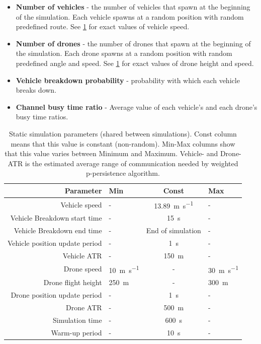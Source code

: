 \documentclass[]{nsm-thesis}
\begin{document}
\begin{itemize}

	\item \textbf{Number of vehicles} - the number of vehicles that spawn at the beginning of the simulation. Each vehicle spawns at a random position with random predefined route. See \cref{tab:simulationparams} for exact values of vehicle speed.
	
	\item \textbf{Number of drones} - the number of drones that spawn at the beginning of the simulation. Each drone spawns at a random position with random predefined angle and speed. See \cref{tab:simulationparams} for exact values of drone height and speed.
	
	\item \textbf{Vehicle breakdown probability} - probability with which each vehicle breaks down.

	\item \textbf{Channel busy time ratio} - Average value of each vehicle's and each drone's busy time ratios.
\end{itemize}

\begin{table}
    \centering
    \begin{tabular}{rlcl}
        \toprule
        Parameter & Min & Const & Max \\
        \midrule
		Vehicle speed & - & \SI{13.89}{\meter\per\second} & - \\
		Vehicle Breakdown start time & - & \SI{15}{\second} & - \\
		Vehicle Breakdown end time & - & End of simulation & - \\
		Vehicle position update period & - & \SI{1}{\second} & - \\
		Vehicle \ac{ATR} & - & \SI{150}{\meter} & - \\

        	Drone speed & \SI{10}{\meter\per\second} & - & \SI{30}{\meter\per\second} \\
        	Drone flight height & \SI{250}{\meter} & - & \SI{300}{\meter} \\
		Drone position update period & - & \SI{1}{\second} & - \\
		Drone \ac{ATR} & - & \SI{500}{\meter} & - \\

		Simulation time & - & \SI{600}{\second} & - \\
		Warm-up period & - & \SI{10}{\second} & - \\
		
        \bottomrule
    \end{tabular}
    \caption{Static simulation parameters (shared between simulations). Const column means that this value is constant (non-random). Min-Max columns show that this value varies between Minimum and Maximum. Vehicle- and Drone- \ac{ATR} is the estimated average range of communication needed by weighted p-persistence algorithm.}
    \label{tab:simulationparams}
\end{table}
\end{document}
